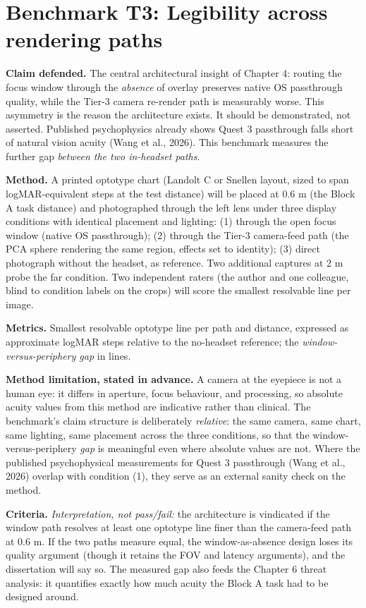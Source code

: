 \section{Benchmark T3: Legibility across rendering paths}

\textbf{Claim defended.} The central architectural insight of Chapter 4: routing the focus window
through the \textit{absence} of overlay preserves native OS passthrough quality, while the Tier-3 camera
re-render path is measurably worse. This asymmetry is the reason the architecture exists. It should
be demonstrated, not asserted. Published psychophysics already shows Quest 3 passthrough falls
short of natural vision acuity (Wang et al., 2026). This benchmark measures the
further gap \textit{between the two in-headset paths}.

\textbf{Method.} A printed optotype chart (Landolt C or Snellen layout, sized to span logMAR-equivalent
steps at the test distance) will be placed at 0.6 m (the Block A task distance) and photographed
through the left lens under three display conditions with identical placement and lighting:
(1) through the open focus window (native OS passthrough); (2) through the Tier-3 camera-feed path
(the PCA sphere rendering the same region, effects set to identity); (3) direct photograph without
the headset, as reference. Two additional captures at 2 m probe the far condition. Two independent
raters (the author and one colleague, blind to condition labels on the crops) will score the
smallest resolvable line per image.

\textbf{Metrics.} Smallest resolvable optotype line per path and distance, expressed as approximate
logMAR steps relative to the no-headset reference; the \textit{window-versus-periphery gap} in lines.

\textbf{Method limitation, stated in advance.} A camera at the eyepiece is not a human eye: it differs
in aperture, focus behaviour, and processing, so absolute acuity values from this method are
indicative rather than clinical. The benchmark's claim structure is deliberately \textit{relative}: the
same camera, same chart, same lighting, same placement across the three conditions, so that the
window-versus-periphery \textit{gap} is meaningful even where absolute values are not. Where the published
psychophysical measurements for Quest 3 passthrough (Wang et al., 2026) overlap with condition (1),
they serve as an external sanity check on the method.

\textbf{Criteria.} \textit{Interpretation, not pass/fail:} the architecture is vindicated if the window path
resolves at least one optotype line finer than the camera-feed path at 0.6 m. If the two paths
measure equal, the window-as-absence design loses its quality argument (though it retains the FOV
and latency arguments), and the dissertation will say so. The measured gap also feeds the Chapter 6
threat analysis: it quantifies exactly how much acuity the Block A task had to be designed around.

